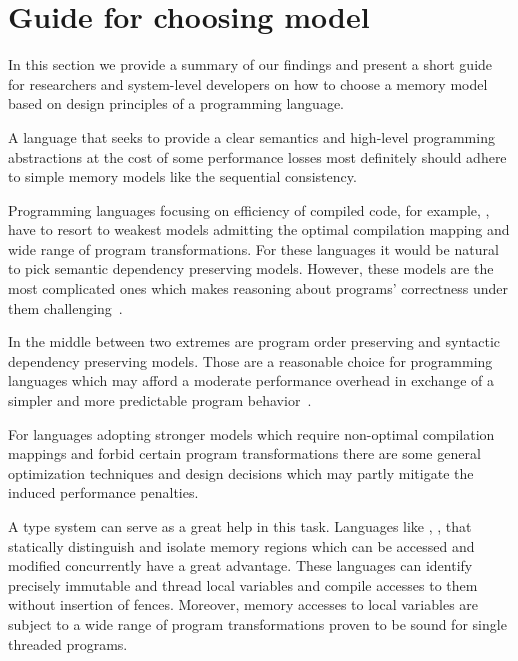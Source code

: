 \section{Guide for choosing model}
\label{sec:discussion}

In this section we provide a summary of our findings
and present a short guide for researchers and system-level developers 
on how to choose a memory model based on 
design principles of a programming language.   

A language that seeks to provide a clear semantics and 
high-level programming abstractions at the cost 
of some performance losses most definitely should 
adhere to simple memory models like the sequential consistency. 

Programming languages focusing on efficiency 
of compiled code, for example, \CPP, 
have to resort to weakest models admitting 
the optimal compilation mapping 
and wide range of program transformations. 
For these languages it would be natural 
to pick semantic dependency preserving models.
However, these models are the most complicated ones
which makes reasoning about programs' correctness
under them challenging~\cite{Svendsen-al:ESOP18}.

In the middle between two extremes are program order preserving and 
syntactic dependency preserving models.
Those are a reasonable choice for programming languages
which may afford a moderate performance overhead 
in exchange of a simpler and more predictable program behavior~\cite{Ou-Demsky:OOPSLA18}.

For languages adopting stronger models which require non-optimal
compilation mappings and forbid certain program transformations
there are some general optimization techniques and design decisions
which may partly mitigate the induced performance penalties.

A type system can serve as a great help in this task. 
Languages like \Haskell, \OCaml, \Rust that 
statically distinguish and isolate memory regions 
which can be accessed and modified concurrently have a great advantage.
These languages can identify precisely 
immutable and thread local variables
and compile accesses to them without insertion of fences.
Moreover, memory accesses to local variables are subject to 
a wide range of program transformations proven to be
sound for single threaded programs. 
 
